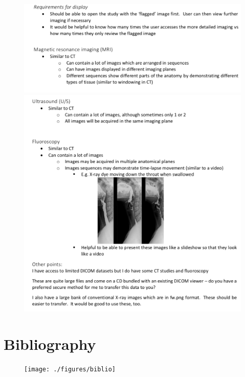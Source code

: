 \documentclass[12pt,twoside]{article}
\begin{document}
\begin{figure}[ht]
\centering
\includegraphics[width = 0.95\hsize]{./figures/ImagingSpec3}
\includegraphics[width = 0.95\hsize]{./figures/ImagingSpec4}
\end{figure}
\clearpage



\section{Bibliography}

\begin{figure}[ht]
\centering
\texttt{[image: ./figures/biblio]}
\end{figure}
\clearpage
\end{document}
